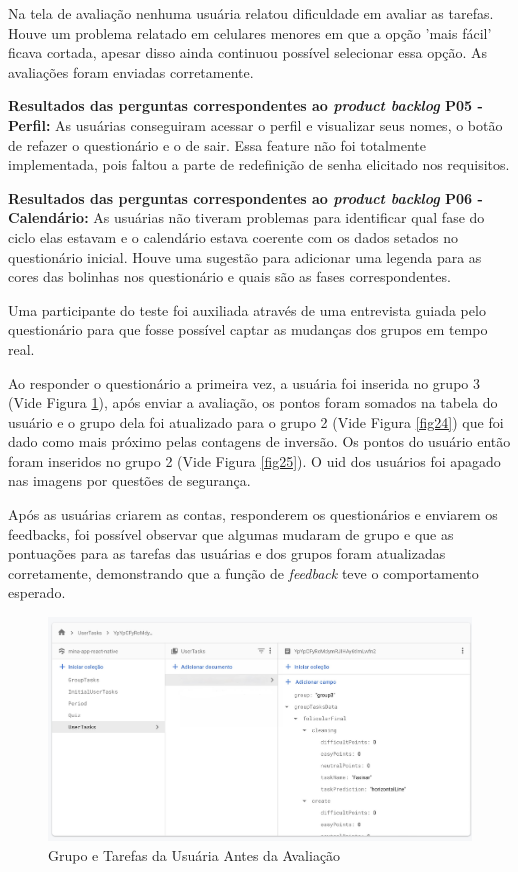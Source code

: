 Na tela de avaliação nenhuma usuária relatou dificuldade em avaliar as tarefas. Houve um problema relatado 
em celulares menores em que a opção 'mais fácil' ficava cortada, apesar disso ainda continuou possível selecionar 
essa opção. As avaliações foram enviadas corretamente.

\textbf{Resultados das perguntas correspondentes ao \emph{product backlog} P05 - Perfil:} As usuárias conseguiram acessar o perfil 
e visualizar seus nomes, o botão de refazer o questionário e o de sair. Essa feature não foi totalmente implementada, pois faltou a 
parte de redefinição de senha elicitado nos requisitos.

\textbf{Resultados das perguntas correspondentes ao \emph{product backlog} P06 - Calendário:} As usuárias não tiveram problemas 
para identificar qual fase do ciclo elas estavam e o calendário estava coerente com os dados setados no questionário inicial.
Houve uma sugestão para adicionar uma legenda para as cores das bolinhas nos questionário e quais são as fases correspondentes. 

Uma participante do teste foi auxiliada através de uma entrevista guiada pelo 
questionário para que fosse possível captar as mudanças dos grupos em tempo real. 

Ao responder o questionário a primeira vez, a usuária foi inserida no grupo 3 (Vide Figura \ref{fig23}), 
após enviar a avaliação, os pontos foram somados 
na tabela do usuário e o grupo dela foi atualizado para o grupo 2 (Vide Figura \ref{fig24}) 
que foi dado como mais próximo pelas contagens de inversão. 
Os pontos do usuário então foram inseridos no grupo 2 (Vide Figura \ref{fig25}). O uid dos usuários foi apagado nas 
imagens por questões de segurança.

Após as usuárias criarem as contas, responderem os questionários e enviarem os feedbacks, foi possível observar que algumas 
mudaram de grupo e que as pontuações para as tarefas das usuárias e dos grupos foram atualizadas corretamente, demonstrando que 
a função de \emph{feedback} teve o comportamento esperado. 

\begin{figure}[ht]
	\caption{Grupo e Tarefas da Usuária Antes da Avaliação}
	\begin{center}
	\includegraphics[keepaspectratio=true,scale=0.18]{figuras/db1.jpeg}
	\end{center}
    \label{fig23}
\end{figure}

